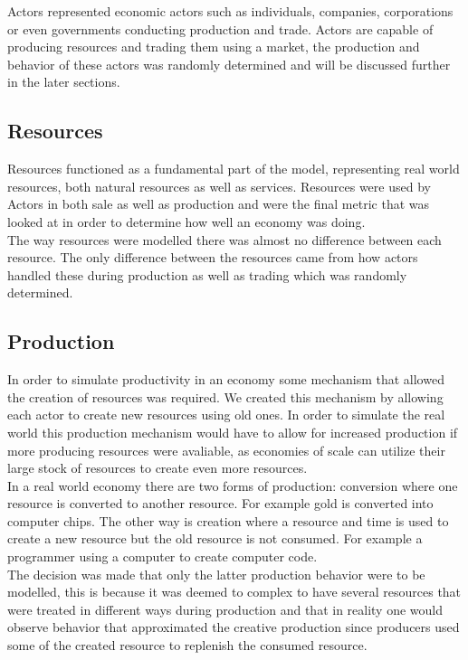 \documentclass[11p]{article}
\begin{document}
Actors represented economic actors such as individuals, companies, corporations or even governments conducting production and trade. Actors are capable of producing resources and trading them using a market, the production and behavior of these actors was randomly determined and will be discussed further in the later sections.
\subsection{Resources}
Resources functioned as a fundamental part of the model, representing real world resources, both natural resources as well as services. Resources were used by Actors in both sale as well as production and were the final metric that was looked at in order to determine how well an economy was doing.
\\

The way resources were modelled there was almost no difference between each resource. The only difference between the resources came from how actors handled these during production as well as trading which was randomly determined.
\subsection{Production}
In order to simulate productivity in an economy some mechanism that allowed the creation of resources was required. We created this mechanism by allowing each actor to create new resources using old ones. In order to simulate the real world this production mechanism would have to allow for increased production if more producing resources were avaliable, as economies of scale can utilize their large stock of resources to create even more resources.
\\

In a real world economy there are two forms of production: conversion where one resource is converted to another resource. For example gold is converted into computer chips. The other way is creation where a resource and time is used to create a new resource but the old resource is not consumed. For example a programmer using a computer to create computer code.
\\

The decision was made that only the latter production behavior were to be modelled, this is because it was deemed to complex to have several resources that were treated in different ways during production and that in reality one would observe behavior that approximated the creative production since producers used some of the created resource to replenish the consumed resource.
\\
\end{document}
